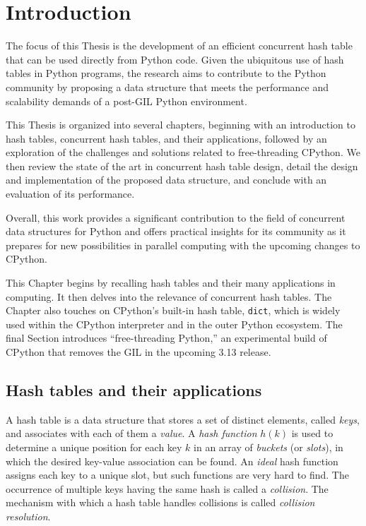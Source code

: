 \chapter{Introduction}\label{ch:introduction}

The focus of this Thesis is the development of an efficient concurrent hash table that can be used directly from Python code.
Given the ubiquitous use of hash tables in Python programs, the research aims to contribute to the Python community by proposing a data structure that meets the performance and scalability demands of a post-GIL Python environment.

This Thesis is organized into several chapters, beginning with an introduction to hash tables, concurrent hash tables, and their applications, followed by an exploration of the challenges and solutions related to free-threading CPython.
We then review the state of the art in concurrent hash table design, detail the design and implementation of the proposed data structure, and conclude with an evaluation of its performance.

Overall, this work provides a significant contribution to the field of concurrent data structures for Python and offers practical insights for its community as it prepares for new possibilities in parallel computing with the upcoming changes to CPython.

This Chapter begins by recalling hash tables and their many applications in computing.
It then delves into the relevance of concurrent hash tables.
The Chapter also touches on CPython's built-in hash table, \texttt{dict}, which is widely used within the CPython interpreter and in the outer Python ecosystem.
The final Section introduces ``free-threading Python,'' an experimental build of CPython that removes the GIL in the upcoming 3.13 release.


\section{Hash tables and their applications}\label{sec:hash-tables}

A hash table is a data structure that stores a set of distinct elements, called \emph{keys}, and associates with each of them a \emph{value}.
A \emph{{hash function}} $h(k)$ is used to determine a unique position for each key $k$ in an array of \emph{buckets} (or \emph{slots}), in which the desired key-value association can be found.
An \emph{ideal} hash function assigns each key to a unique slot, but such functions are very hard to find.
The occurrence of multiple keys having the same hash is called a \emph{collision}.
The mechanism with which a hash table handles collisions is called \emph{{collision resolution}}.

